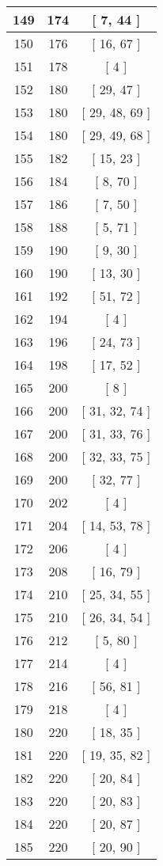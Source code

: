\begin{center}
\begin{longtable}[H]{|| c c c ||}
149 & 174 & [ 7, 44 ]
\\\hline
150 & 176 & [ 16, 67 ]
\\\hline
151 & 178 & [ 4 ]
\\\hline
152 & 180 & [ 29, 47 ]
\\\hline
153 & 180 & [ 29, 48, 69 ]
\\\hline
154 & 180 & [ 29, 49, 68 ]
\\\hline
155 & 182 & [ 15, 23 ]
\\\hline
156 & 184 & [ 8, 70 ]
\\\hline
157 & 186 & [ 7, 50 ]
\\\hline
158 & 188 & [ 5, 71 ]
\\\hline
159 & 190 & [ 9, 30 ]
\\\hline
160 & 190 & [ 13, 30 ]
\\\hline
161 & 192 & [ 51, 72 ]
\\\hline
162 & 194 & [ 4 ]
\\\hline
163 & 196 & [ 24, 73 ]
\\\hline
164 & 198 & [ 17, 52 ]
\\\hline
165 & 200 & [ 8 ]
\\\hline
166 & 200 & [ 31, 32, 74 ]
\\\hline
167 & 200 & [ 31, 33, 76 ]
\\\hline
168 & 200 & [ 32, 33, 75 ]
\\\hline
169 & 200 & [ 32, 77 ]
\\\hline
170 & 202 & [ 4 ]
\\\hline
171 & 204 & [ 14, 53, 78 ]
\\\hline
172 & 206 & [ 4 ]
\\\hline
173 & 208 & [ 16, 79 ]
\\\hline
174 & 210 & [ 25, 34, 55 ]
\\\hline
175 & 210 & [ 26, 34, 54 ]
\\\hline
176 & 212 & [ 5, 80 ]
\\\hline
177 & 214 & [ 4 ]
\\\hline
178 & 216 & [ 56, 81 ]
\\\hline
179 & 218 & [ 4 ]
\\\hline
180 & 220 & [ 18, 35 ]
\\\hline
181 & 220 & [ 19, 35, 82 ]
\\\hline
182 & 220 & [ 20, 84 ]
\\\hline
183 & 220 & [ 20, 83 ]
\\\hline
184 & 220 & [ 20, 87 ]
\\\hline
185 & 220 & [ 20, 90 ]

\end{longtable}
\end{center}
